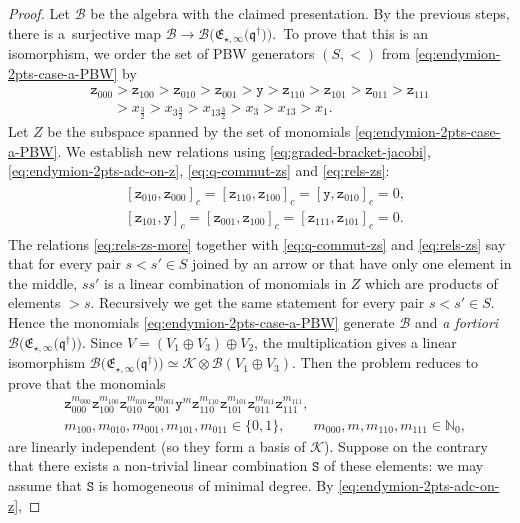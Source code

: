 \documentclass[pdftex]{sigma}
\numberwithin{equation}{section}
\newcommand{\toba}{\mathscr B}
\newcommand{\K}{{\mathcal{K}}}
\newcommand{\N}{{\mathbb N}}
\newcommand{\yt}{\mathtt{y}}
\newcommand{\zt}{\mathtt{z}}
\newcommand{\eny}{\mathfrak{E}}
\newcommand{\enyIIb}[1]{\eny_{\star,#1}}
\newcommand{\bq}{\mathfrak{q}}
\newcommand{\bqs}{\bq^{\dagger}}
\newcommand{\tresdos}{\frac{3}{2}}
\begin{document}
\begin{proof}
Let $\toba$ be the algebra with the claimed presentation. By the previous steps,
there is a~surjective map $\toba \to \toba\big(\enyIIb{\infty}\big(\bqs\big)\big)$.\
To prove that this is an isomorphism, we order the set of PBW generators $(S,<)$ from \eqref{eq:endymion-2pts-case-a-PBW}
by
\begin{gather*}
\zt_{000}>\zt_{100}>\zt_{010}> \zt_{001} > \yt > \zt_{110} > \zt_{101} > \zt_{011} > \zt_{111}
\\ \phantom{\zt_{000}}
{}> x_{\tresdos} > x_{3\tresdos} > x_{13\tresdos} > x_3 > x_{13} > x_1.
\end{gather*}
Let $Z$ be the subspace spanned by the set of monomials \eqref{eq:endymion-2pts-case-a-PBW}.
We establish new relations using \eqref{eq:graded-bracket-jacobi},
\eqref{eq:endymion-2pts-adc-on-z}, \eqref{eq:q-commut-zs} and \eqref{eq:rels-zs}:
\begin{align}\label{eq:rels-zs-more}
\begin{aligned}
&[ \zt_{010},\zt_{000}]_c = [ \zt_{110},\zt_{100}]_c = [ \yt,\zt_{010}]_c = 0,
\\
&[ \zt_{101}, \yt ]_c = [ \zt_{001},\zt_{100}]_c = [ \zt_{111},\zt_{101}]_c = 0.
\end{aligned}
\end{align}
The relations \eqref{eq:rels-zs-more} together with \eqref{eq:q-commut-zs} and \eqref{eq:rels-zs}
say that for every pair $s<s'\in S$ joined by an arrow or that have only one element in the middle, $ss'$ is a linear combination of monomials in $Z$ which are products of elements $>s$. Recursively we get the same statement for every pair $s<s'\in S$. Hence the monomials
\eqref{eq:endymion-2pts-case-a-PBW} generate $\toba$ and \emph{a fortiori} $\toba\big(\enyIIb{\infty}\big(\bqs\big)\big)$.
Since $V = (V_1 \oplus V_3) \oplus V_2$, the multiplication gives a linear isomorphism $\toba\big(\enyIIb{\infty}\big(\bqs\big)\big) \simeq \K \otimes \toba(V_1\oplus V_3)$. Then the problem reduces to prove that the monomials
\begin{align*}
& \zt_{000}^{m_{000}} \zt_{100}^{m_{100}} \zt_{010}^{m_{010}} \zt_{001}^{m_{001}} \yt^m \zt_{110}^{m_{110}} \zt_{101}^{m_{101}} \zt_{011}^{m_{011}} \zt_{111}^{m_{111}},
\\
& m_{100}, m_{010}, m_{001}, m_{101},m_{011} \in \{0,1\}, \qquad m_{000}, m, m_{110}, m_{111} \in\N_0,
\end{align*}
are linearly independent (so they form a basis of $\K$). Suppose on the contrary that there exists a non-trivial linear combination $\mathtt{S}$ of these elements: we may assume that $\mathtt{S}$ is homogeneous of minimal degree. By \eqref{eq:endymion-2pts-adc-on-z},

\end{proof}
\end{document}
